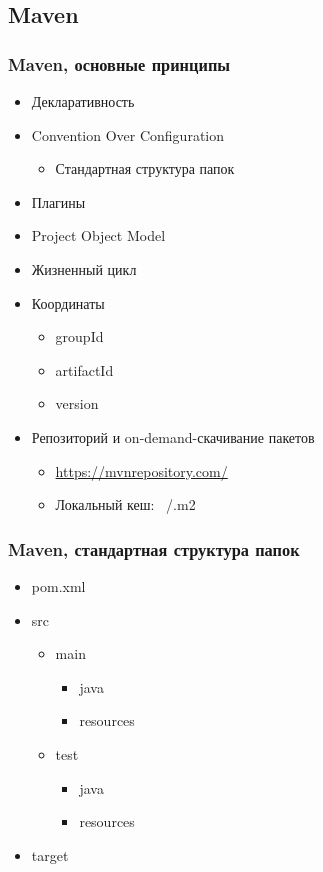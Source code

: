 \documentclass[xetex,mathserif,serif]{beamer}
\begin{document}
	\subsection{Maven}

	\begin{frame}
		\frametitle{Maven, основные принципы}
		\begin{itemize}
			\item Декларативность
			\item Convention Over Configuration
			\begin{itemize}
				\item Стандартная структура папок
			\end{itemize}
			\item Плагины
			\item Project Object Model
			\item Жизненный цикл
			\item Координаты
			\begin{itemize}
				\item groupId
				\item artifactId
				\item version
			\end{itemize}
			\item Репозиторий и on-demand-скачивание пакетов
			\begin{itemize}
				\item \url{https://mvnrepository.com/}
				\item Локальный кеш: ~/.m2
			\end{itemize}
		\end{itemize}
	\end{frame}

	\begin{frame}
		\frametitle{Maven, стандартная структура папок}
		\begin{itemize}
			\item pom.xml
			\item src
			\begin{itemize}
				\item main
				\begin{itemize}
					\item java
					\item resources
				\end{itemize}
				\item test
				\begin{itemize}
					\item java
					\item resources
				\end{itemize}
			\end{itemize}
			\item target
		\end{itemize}
	\end{frame}
\end{document}
